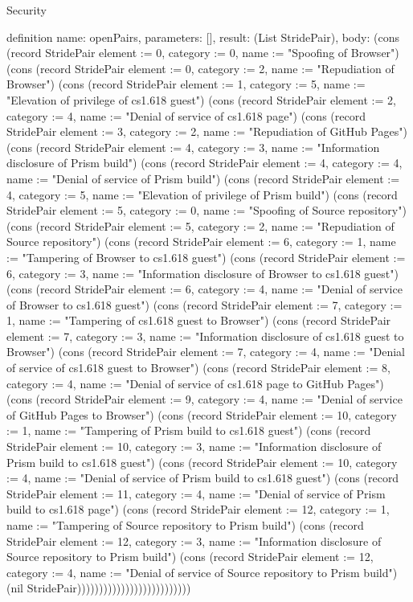 \begin{lexlean}{Security}
\begin{semanticmodule}
definition{
  name: openPairs,
  parameters: [],
  result: (List StridePair),
  body: (cons (record StridePair {element := 0, category := 0, name := "Spoofing of Browser"}) (cons (record StridePair {element := 0, category := 2, name := "Repudiation of Browser"}) (cons (record StridePair {element := 1, category := 5, name := "Elevation of privilege of cs1.618 guest"}) (cons (record StridePair {element := 2, category := 4, name := "Denial of service of cs1.618 page"}) (cons (record StridePair {element := 3, category := 2, name := "Repudiation of GitHub Pages"}) (cons (record StridePair {element := 4, category := 3, name := "Information disclosure of Prism build"}) (cons (record StridePair {element := 4, category := 4, name := "Denial of service of Prism build"}) (cons (record StridePair {element := 4, category := 5, name := "Elevation of privilege of Prism build"}) (cons (record StridePair {element := 5, category := 0, name := "Spoofing of Source repository"}) (cons (record StridePair {element := 5, category := 2, name := "Repudiation of Source repository"}) (cons (record StridePair {element := 6, category := 1, name := "Tampering of Browser to cs1.618 guest"}) (cons (record StridePair {element := 6, category := 3, name := "Information disclosure of Browser to cs1.618 guest"}) (cons (record StridePair {element := 6, category := 4, name := "Denial of service of Browser to cs1.618 guest"}) (cons (record StridePair {element := 7, category := 1, name := "Tampering of cs1.618 guest to Browser"}) (cons (record StridePair {element := 7, category := 3, name := "Information disclosure of cs1.618 guest to Browser"}) (cons (record StridePair {element := 7, category := 4, name := "Denial of service of cs1.618 guest to Browser"}) (cons (record StridePair {element := 8, category := 4, name := "Denial of service of cs1.618 page to GitHub Pages"}) (cons (record StridePair {element := 9, category := 4, name := "Denial of service of GitHub Pages to Browser"}) (cons (record StridePair {element := 10, category := 1, name := "Tampering of Prism build to cs1.618 guest"}) (cons (record StridePair {element := 10, category := 3, name := "Information disclosure of Prism build to cs1.618 guest"}) (cons (record StridePair {element := 10, category := 4, name := "Denial of service of Prism build to cs1.618 guest"}) (cons (record StridePair {element := 11, category := 4, name := "Denial of service of Prism build to cs1.618 page"}) (cons (record StridePair {element := 12, category := 1, name := "Tampering of Source repository to Prism build"}) (cons (record StridePair {element := 12, category := 3, name := "Information disclosure of Source repository to Prism build"}) (cons (record StridePair {element := 12, category := 4, name := "Denial of service of Source repository to Prism build"}) (nil StridePair))))))))))))))))))))))))))
}


\end{semanticmodule}
\end{lexlean}
